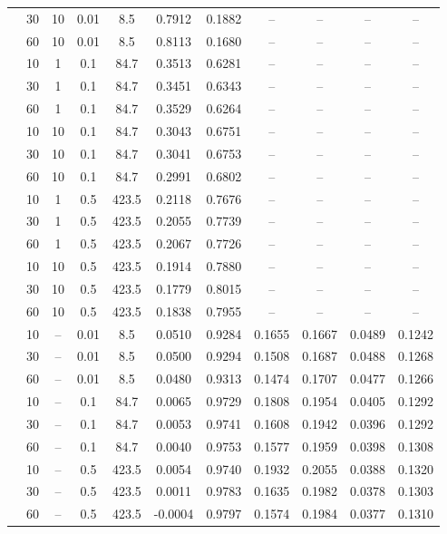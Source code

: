 \begin{longtable}{@{}l c c c c c c c c c c@{}}
	& 30 & 10 & 0.01 & 8.5 & 0.7912 & 0.1882 & -- & -- & -- & -- \\
	& 60 & 10 & 0.01 & 8.5 & 0.8113 & 0.1680 & -- & -- & -- & -- \\
	& 10 & 1 & 0.1 & 84.7 & 0.3513 & 0.6281 & -- & -- & -- & -- \\
	& 30 & 1 & 0.1 & 84.7 & 0.3451 & 0.6343 & -- & -- & -- & -- \\
	& 60 & 1 & 0.1 & 84.7 & 0.3529 & 0.6264 & -- & -- & -- & -- \\
	& 10 & 10 & 0.1 & 84.7 & 0.3043 & 0.6751 & -- & -- & -- & -- \\
	& 30 & 10 & 0.1 & 84.7 & 0.3041 & 0.6753 & -- & -- & -- & -- \\
	& 60 & 10 & 0.1 & 84.7 & 0.2991 & 0.6802 & -- & -- & -- & -- \\
	& 10 & 1 & 0.5 & 423.5 & 0.2118 & 0.7676 & -- & -- & -- & -- \\
	& 30 & 1 & 0.5 & 423.5 & 0.2055 & 0.7739 & -- & -- & -- & -- \\
	& 60 & 1 & 0.5 & 423.5 & 0.2067 & 0.7726 & -- & -- & -- & -- \\
	& 10 & 10 & 0.5 & 423.5 & 0.1914 & 0.7880 & -- & -- & -- & -- \\
	& 30 & 10 & 0.5 & 423.5 & 0.1779 & 0.8015 & -- & -- & -- & -- \\
	& 60 & 10 & 0.5 & 423.5 & 0.1838 & 0.7955 & -- & -- & -- & -- \\
	\arrayrulecolor{gray!60}\midrule\arrayrulecolor{black}
	\multirow{9}{*}{\textbf{FLTrust + TopK}} & 10 & -- & 0.01 & 8.5 & 0.0510 & 0.9284 & 0.1655 & 0.1667 & 0.0489 & 0.1242 \\
	& 30 & -- & 0.01 & 8.5 & 0.0500 & 0.9294 & 0.1508 & 0.1687 & 0.0488 & 0.1268 \\
	& 60 & -- & 0.01 & 8.5 & 0.0480 & 0.9313 & 0.1474 & 0.1707 & 0.0477 & 0.1266 \\
	& 10 & -- & 0.1 & 84.7 & 0.0065 & 0.9729 & 0.1808 & 0.1954 & 0.0405 & 0.1292 \\
	& 30 & -- & 0.1 & 84.7 & 0.0053 & 0.9741 & 0.1608 & 0.1942 & 0.0396 & 0.1292 \\
	& 60 & -- & 0.1 & 84.7 & 0.0040 & 0.9753 & 0.1577 & 0.1959 & 0.0398 & 0.1308 \\
	& 10 & -- & 0.5 & 423.5 & 0.0054 & 0.9740 & 0.1932 & 0.2055 & 0.0388 & 0.1320 \\
	& 30 & -- & 0.5 & 423.5 & 0.0011 & 0.9783 & 0.1635 & 0.1982 & 0.0378 & 0.1303 \\
	& 60 & -- & 0.5 & 423.5 & -0.0004 & 0.9797 & 0.1574 & 0.1984 & 0.0377 & 0.1310 \\

\end{longtable}

